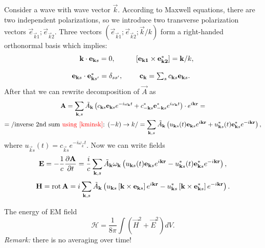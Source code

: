 	Consider a wave with wave vector $\vec{k}$. According to Maxwell equations, there are two independent polarizations, so we introduce two transverse polarization vectors $\vec{e}_{\vec{k}1}; \vec{e}_{\vec{k}2}$. Three vectors $(\vec{e}_{\vec{k}1}; \vec{e}_{\vec{k}2}; \vec{k}/k)$ form a right-handed orthonormal basis which implies:
	\begin{equation}
		\begin{matrix}
			\vec{k} \cdot \vec{e}_{\vec{k}s} = 0, && \vecmult{\vec{e}_{\vec{k}1}}{\vec{e}^*_{\vec{k}2}} = \vec{k}/k, \\ \\
			\vec{e}_{\vec{k}s} \cdot \vec{e}^*_{\vec{k}s'} = \delta_{ss'}, && \vec{c}_{\vec{k}} = \sum_s c_{\vec{k}s} \vec{e}_{\vec{k}s}.
		\end{matrix}
	\end{equation}
	After that we can rewrite decomposition of $\vec{A}$ as
	\begin{multline}
		\vec{A} = \sum_{\vec{k},s} \tilde{A}_{\vec{k}} \left( c_{\vec{k}s} \vec{e}_{\vec{k}s} e^{-i \omega_{\vec{k}} t} + c^*_{-\vec{k}s} \vec{e}^*_{-\vec{k}s}  e^{i \omega_{\vec{k}} t} \right) \cdot e^{i \vec{k} \vec{r}} = \\
		= \left/ \text{inverse 2nd sum \textcolor{red}{using \eqref{kminsk}}: } (-k) \to k \right/ =\sum_{\vec{k},s} \tilde{A}_{\vec{k}} \left( u_{\vec{k}s}(t) \vec{e}_{\vec{k}s} e^{i \vec{k} \vec{r}} + u^*_{\vec{k}s}(t) \vec{e}^*_{\vec{k}s}  e^{-i \vec{k} \vec{r}} \right),
	\end{multline}
	where $u_{\vec{k}s}(t) = c_{\vec{k}s} e^{-i \omega_{\vec{k}} t}$. Now we can write fields
	\begin{equation}
		\vec{E} = -\frac{1}{c} \parder{\vec{A}}{t} = \frac{i}{c} \sum_{\vec{k},s} \tilde{A}_{\vec{k}} \omega_{\vec{k}} \left( u_{\vec{k}s}(t) \vec{e}_{\vec{k}s} e^{i \vec{k} \vec{r}} - u^*_{\vec{k}s}(t) \vec{e}^*_{\vec{k}s}  e^{-i \vec{k} \vec{r}} \right),
	\end{equation}
	\begin{equation}
		\vec{H} = \Rot \vec{A} = i \sum_{\vec{k},s} \tilde{A}_{\vec{k}} \left( u_{\vec{k}s} \left[ \vec{k} \times \vec{e}_{\vec{k}s} \right] e^{i \vec{k} \vec{r}} - u^*_{\vec{k}s} \left[ \vec{k} \times \vec{e}^*_{\vec{k}s} \right] e^{-i \vec{k} \vec{r}} \right).
	\end{equation}
	
	The energy of EM field
	\begin{equation}
		\mathscr{H} = \frac{1}{8 \pi} \int \left(\vec{H}^2 + \vec{E}^2 \right) dV.
	\end{equation}
	\textit{Remark:} there is no averaging over time!
	
